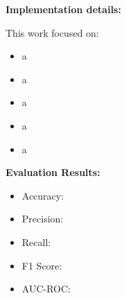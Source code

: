 \documentclass[11pt,a4paper]{article}
\begin{document}
\begin{tcolorbox}[
        title=Visualization and Model Evaluation,
        colback=mediumblue!30,
        colframe=darkblue,
        boxrule=0.5pt,
        fonttitle=\bfseries\sffamily\footnotesize,
        fontupper=\footnotesize
    ]
    \textbf{Implementation details:}

    This work focused on:
    \begin{itemize}[leftmargin=*, itemsep=2pt, parsep=0pt]
        \item a
        \item a
        \item a
        \item a
        \item a
    \end{itemize}

    \textbf{Evaluation Results:}
    \begin{itemize}[leftmargin=*, itemsep=2pt, parsep=0pt]
        \item Accuracy:
        \item Precision:
        \item Recall:
        \item F1 Score:
        \item AUC-ROC:
    \end{itemize}
\end{tcolorbox}
\end{document}
